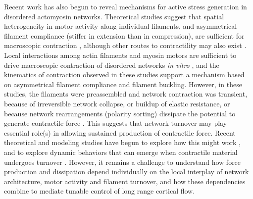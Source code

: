Recent work has also begun to reveal mechanisms for active stress generation in disordered actomyosin networks. Theoretical studies suggest that spatial heterogeneity in motor activity along individual filaments, and asymmetrical filament compliance (stiffer in extension than in compression), are sufficient for macroscopic contraction \cite{1367-2630-14-3-033037,PhysRevX.4.041002}, although other routes to contractility may also exist \cite{PhysRevX.4.041002}.  Local interactions among actin filaments and myosin motors are sufficient to drive macroscopic contraction of disordered networks {\em in vitro} \cite{rheo_2D1}, and the kinematics of contraction observed in these studies support a mechanism based on asymmetrical filament compliance and filament buckling.  However, in these studies, the filaments were preassembled and network contraction was transient, because of irreversible network collapse\cite{Alvarado:2013aa}, or buildup of elastic resistance\cite{Murrell15062014}, or because network rearrangements (polarity sorting) dissipate the potential to generate contractile force \cite{Ennomani2016616,Reymann1310,Ndlec:1997aa,Surrey1167}. This suggests that network turnover may play essential role(s) in allowing sustained production of contractile force. Recent theoretical and modeling studies have begun to explore how this might work \cite{2015arXiv150706182H,Mak:2016aa,10.1371/journal.pone.0000696}, and to explore dynamic behaviors that can emerge when contractile material undergoes turnover \cite{PhysRevLett.103.058102,PhysRevLett.113.148102}. However, it remains a challenge to understand how force production and dissipation depend individually on the local interplay of network architecture, motor activity and filament turnover, and how these dependencies combine to mediate tunable control of long range cortical flow. 

